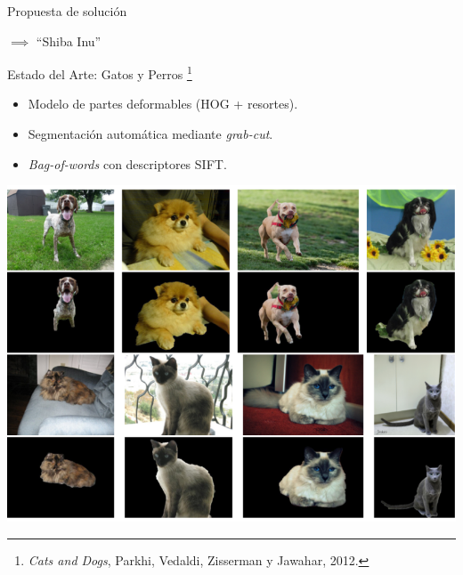 \documentclass{beamer}
\begin{document}
\begin{frame}{Propuesta de solución}
\begin{itemize}
            \pause
            \begin{center}
                \pause
                $\implies$
                {``Shiba Inu''\ \ \ \ \ \ }
            \end{center}
    \end{itemize}
\end{frame}

\begin{frame}{Estado del Arte: Gatos y Perros \footnote{\emph{Cats and
    Dogs}, Parkhi, Vedaldi, Zisserman y Jawahar, 2012.}}
    \begin{itemize}
            \pause
        \item Modelo de partes deformables (HOG + resortes).
            \pause
        \item Segmentación automática mediante \emph{grab-cut}.
            \pause
        \item \emph{Bag-of-words} con descriptores SIFT. 
            \pause
    \end{itemize}
    \begin{center}
        \includegraphics[scale=0.2]{imagen/parkhi}
    \end{center}
\end{frame}
\end{document}
